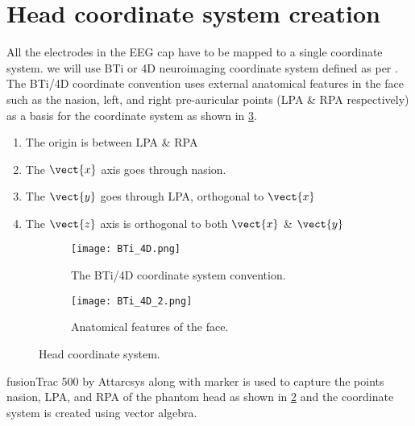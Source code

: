 \section{Head coordinate system creation}
All the electrodes in the EEG cap have to be mapped to a single coordinate system. we will use BTi or 4D neuroimaging coordinate system defined as per \cite{BTi/4D}. The BTi/4D coordinate convention uses external anatomical features in the face such as the nasion, left, and right pre-auricular points (LPA \& RPA respectively) as a basis for the coordinate system as shown in \cref{fig:BTi_4D}. 

\begin{enumerate}
	\item The origin is between LPA \& RPA
	\item The $\vect{x}$ axis goes through nasion.
	\item The $\vect{y}$ goes through LPA, orthogonal to $\vect{x}$
	\item The $\vect{z}$ axis is orthogonal to both $\vect{x}$ \& $\vect{y}$
\end{enumerate}

\begin{figure}[hbt!]
	\centering
	\begin{subfigure}{0.49\textwidth}
		\texttt{[image: BTi\_4D.png]}
		\caption{The BTi/4D coordinate system convention.}
		\label{fig:BTi_4D_1} 	
	\end{subfigure}
	\hfill
	\begin{subfigure}{0.37\textwidth}
		\centering
		\texttt{[image: BTi\_4D\_2.png]}
		\caption{Anatomical features of the face.} 
		\label{fig:BTi_4D_2}	
	\end{subfigure}
	\caption{Head coordinate system.}
	\label{fig:BTi_4D} 
\end{figure}  

fusionTrac 500 by Attarcsys along with marker is used to capture the points nasion, LPA, and RPA of the phantom head as shown in \cref{fig:BTi_4D_2} and the coordinate system is created using vector algebra. 

